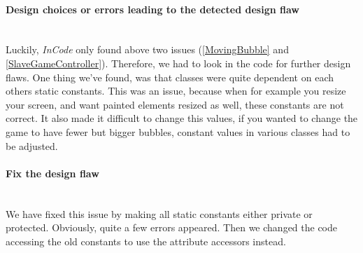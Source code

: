 \documentclass[a4paper]{article}
\begin{document}
\paragraph{Design choices or errors leading to the detected design flaw}\mbox{}\\
Luckily, \textit{InCode} only found above two issues (\ref{MovingBubble} and  \ref{SlaveGameController}). Therefore, we had to look in the code for further design flaws. One thing we've found, was that classes were quite dependent on each others static constants. This was an issue, because when for example you resize your screen, and want painted elements resized as well, these constants are not correct. It also made it difficult to change this values, if you wanted to change the game to have fewer but bigger bubbles, constant values in various classes had to be adjusted.

\paragraph{Fix the design flaw}\mbox{}\\
We have fixed this issue by making all static constants either private or protected. Obviously, quite a few errors appeared. Then we changed the code accessing the old constants to use the attribute accessors instead.
\end{document}
